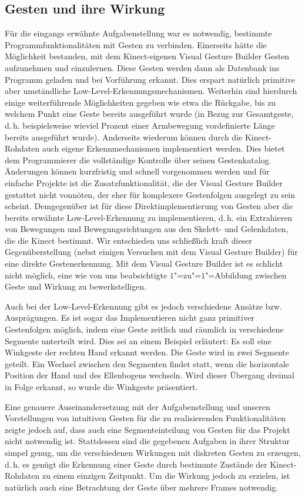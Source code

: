 \subsection{Gesten und ihre Wirkung}
	Für die eingangs erwähnte Aufgabenstellung war es notwendig, bestimmte Programmfunktionalitäten mit Gesten zu verbinden. Einerseits hätte die Möglichkeit bestanden, mit dem Kinect-eigenen Visual Gesture Builder Gesten aufzunehmen und einzulernen. Diese Gesten werden dann als Datenbank ins Programm geladen und bei Vorführung erkannt. Dies erspart natürlich primitive aber umständliche Low-Level-Erkennungsmechanismen. Weiterhin sind hierdurch einige weiterführende Möglichkeiten gegeben wie etwa die Rückgabe, bis zu welchem Punkt eine Geste bereits ausgeführt wurde (in Bezug zur Gesamtgeste, d.\,h. beispielsweise wieviel Prozent einer Armbewegung vordefinierte Länge bereits ausgeführt wurde). Anderseits wiederum können durch die Kinect-Rohdaten auch eigene Erkennmechanismen implementiert werden. Dies bietet dem Programmierer die vollständige Kontrolle über seinen Gestenkatalog. Änderungen können kurzfristig und schnell vorgenommen werden und für einfache Projekte ist die Zusatzfunktionalität, die der Visual Gesture Builder gestattet nicht vonnöten, der eher für komplexere Gestenfolgen ausgelegt zu sein scheint. Demgegenüber ist für diese Direktimplementierung von Gesten aber die bereits erwähnte Low-Level-Erkennung zu implementieren, d.\,h. ein Extrahieren von Bewegungen und Bewegungsrichtungen aus den Skelett- und Gelenkdaten, die die Kinect bestimmt. Wir entschieden uns schließlich kraft dieser Gegenüberstellung (nebst einigen Versuchen mit dem Visual Gesture Builder) für eine direkte Gestenerkennung. Mit dem Visual Gesture Builder ist es schlicht nicht möglich, eine wie von uns beabsichtigte $1$"=zu"=$1$"=Abbildung zwischen Geste und Wirkung zu bewerkstelligen.\par 
	Auch bei der Low-Level-Erkennung gibt es jedoch verschiedene Ansätze bzw. Ausprägungen. Es ist sogar das Implementieren nicht ganz primitiver Gestenfolgen möglich, indem eine Geste zeitlich und räumlich in verschiedene Segmente unterteilt wird. Dies sei an einem Beispiel erläutert: Es soll eine Winkgeste der rechten Hand erkannt werden. Die Geste wird in zwei Segmente geteilt. Ein Wechsel zwischen den Segmenten findet statt, wenn die horizontale Position der Hand und des Ellenbogens wechseln. Wird dieser Übergang dreimal in Folge erkannt, so wurde die Winkgeste präsentiert.\par
	Eine genauere Auseinandersetzung mit der Aufgabenstellung und unseren Vorstellungen von intuitiven Gesten für die zu realisierenden Funktionalitäten zeigte jedoch auf, dass auch eine Segmenteinteilung von Gesten für das Projekt nicht notwendig ist. Stattdessen sind die gegebenen Aufgaben in ihrer Struktur simpel genug, um die verschiedenen Wirkungen mit diskreten Gesten zu erzeugen, d.\,h. es genügt die Erkennung einer Geste durch bestimmte Zustände der Kinect-Rohdaten zu einem einzigen Zeitpunkt. Um die Wirkung jedoch zu erzielen, ist natürlich auch eine Betrachtung der Geste über mehrere Frames notwendig.\par\medskip
